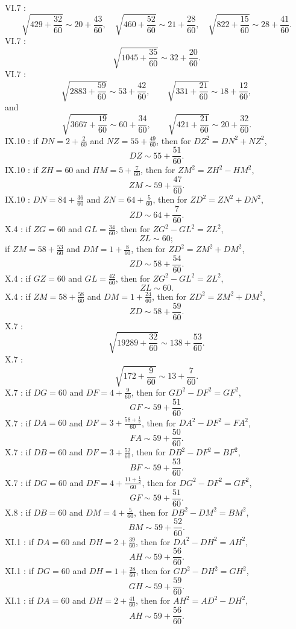 \documentclass{amsart}
\theoremstyle{definition}
\begin{document}
VI.7 \cite[p.~299]{almagest}:
\[
\sqrt{429+\frac{32}{60}} \sim 20+\frac{43}{60},\quad
\sqrt{460+\frac{52}{60}} \sim 21+\frac{28}{60},
\quad 
\sqrt{822+\frac{15}{60}} \sim 28+\frac{41}{60}.
\]
VI.7 \cite[p.~300]{almagest}:
\[
\sqrt{1045+\frac{35}{60}} \sim 32+\frac{20}{60}.
\]
VI.7 \cite[p.~301]{almagest}:
\[
\sqrt{2883+\frac{59}{60}} \sim 53+\frac{42}{60},
\qquad \sqrt{331+\frac{21}{60}} \sim 18+\frac{12}{60},
\]
and
\[
\sqrt{3667+\frac{19}{60}} \sim 60+\frac{34}{60},
\qquad \sqrt{421+\frac{21}{60}} \sim 20+\frac{32}{60}.
\]
IX.10 \cite[p.~463]{almagest}: if $DN=2+\frac{2}{60}$ and $NZ=55+\frac{49}{60}$, then for
$DZ^2=DN^2+NZ^2$,
\[
DZ \sim 55 + \frac{51}{60}.
\]
IX.10 \cite[pp.~465--466]{almagest}: if $ZH=60$ and $HM=5+\frac{7}{60}$, then for $ZM^2=ZH^2-HM^2$,
\[
ZM \sim 59+\frac{47}{60}.
\]
IX.10 \cite[p.~466]{almagest}: $DN=84+\frac{36}{60}$ and $ZN=64+\frac{5}{60}$, then for $ZD^2=ZN^2+DN^2$,
\[
ZD \sim 64+\frac{7}{60}.
\]
X.4 \cite[p.~476]{almagest}: if $ZG=60$ and $GL=\frac{34}{60}$, then for $ZG^2-GL^2=ZL^2$,
\[
ZL \sim 60;
\]
if $ZM=58+\frac{53}{60}$ and $DM=1+\frac{8}{60}$, then for $ZD^2=ZM^2+DM^2$,
\[
ZD \sim 58 + \frac{54}{60}.
\]
X.4 \cite[pp.~477--478]{almagest}: if $GZ=60$ and $GL=\frac{42}{60}$, then for $ZG^2-GL^2=ZL^2$,
\[
ZL \sim 60.
\]
X.4 \cite[p.~478]{almagest}: if $ZM = 58+\frac{58}{60}$ and $DM=1+\frac{24}{60}$, then for $ZD^2=ZM^2+DM^2$,
\[
ZD \sim 58+\frac{59}{60}.
\]
X.7 \cite[p.~488]{almagest}:
\[
\sqrt{19289+\frac{32}{60}} \sim 138+\frac{53}{60}.
\]
X.7 \cite[p.~489]{almagest}:
\[
\sqrt{172+\frac{9}{60}} \sim 13+\frac{7}{60}.
\]
X.7 \cite[p.~493]{almagest}: if $DG=60$ and $DF=4+\frac{9}{60}$, then for $GD^2-DF^2=GF^2$,
\[
GF \sim 59+\frac{51}{60}.
\]
X.7 \cite[p.~495]{almagest}: if $DA=60$ and $DF=3+\frac{58+\frac{1}{2}}{60}$,
then for $DA^2-DF^2=FA^2$,
\[
FA \sim 59 + \frac{50}{60}.
\]
X.7 \cite[p.~496]{almagest}: if $DB=60$ and $DF=3+\frac{52}{60}$, then for
$DB^2-DF^2=BF^2$,
\[
BF \sim 59+\frac{53}{60}.
\]
X.7 \cite[p.~498]{almagest}: if $DG=60$ and $DF=4+\frac{11+\frac{1}{2}}{60}$, then for $DG^2-DF^2=GF^2$,
\[
GF \sim 59+\frac{51}{60}.
\]
X.8 \cite[p.~501]{almagest}: if $DB=60$ and $DM=4+\frac{5}{60}$, then for $DB^2-DM^2=BM^2$,
\[
BM \sim 59+\frac{52}{60}.
\]
XI.1 \cite[p.~512]{almagest}: if $DA=60$ and $DH=2+\frac{39}{60}$, then for $DA^2-DH^2=AH^2$,
\[
AH \sim 59+\frac{56}{60}.
\]
XI.1 \cite[p.~514]{almagest}: if $DG=60$ and $DH=1+\frac{28}{60}$, then for
$GD^2-DH^2=GH^2$,
\[
GH \sim 59+\frac{59}{60}.
\]
XI.1 \cite[p.~516]{almagest}: if $DA=60$ and $DH=2+\frac{41}{60}$, then for $AH^2=AD^2-DH^2$,
\[
AH \sim 59+\frac{56}{60}.
\]
\end{document}
